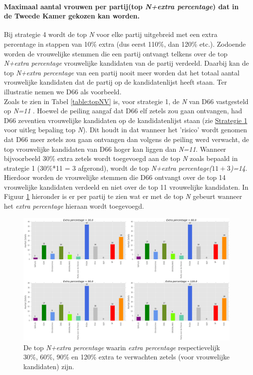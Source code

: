 \paragraph{Maximaal aantal vrouwen per partij(top \textit{N+extra percentage}) dat in de Tweede Kamer gekozen kan worden.} 
Bij strategie 4 wordt de top \textit{N} voor elke partij uitgebreid met een extra percentage in stappen van 10\% extra (dus eerst 110\%, dan 120\% etc.). Zodoende worden de vrouwelijke stemmen die een partij ontvangt telkens over de top \textit{N+extra percentage} vrouwelijke kandidaten van de partij verdeeld. Daarbij kan de top \textit{N+extra percentage} van een partij nooit meer worden dat het totaal aantal vrouwelijke kandidaten dat de partij op de kandidatenlijst heeft staan. Ter illustratie nemen we D66 als voorbeeld. 
\\
\indent Zoals te zien in Tabel \ref{table:topNV} is, voor strategie 1, de \textit{N} van D66 vastgesteld op \textit{N=11} . Hoewel de peiling aangaf dat D66 elf zetels zou gaan ontvangen, had D66 zeventien vrouwelijke kandidaten op de kandidatenlijst staan (zie \hyperref[S1V]{Strategie 1} voor uitleg bepaling top \textit{N}). Dit houdt in dat wanneer het 'risico' wordt genomen dat D66 meer zetels zou gaan ontvangen dan volgens de peiling werd verwacht, de top vrouwelijke kandidaten van D66 hoger kan liggen dan \textit{N=11}. Wanneer bijvoorbeeld 30\% extra zetels wordt toegevoegd aan de top \textit{N} zoals bepaald in strategie 1 (30\%*11 = 3 afgerond), wordt de top \textit{N+extra percentage($11+3$)=14}. Hierdoor worden de vrouwelijke stemmen die D66 ontvangt over de top 14 vrouwelijke kandidaten verdeeld en niet over de top 11 vrouwelijke kandidaten. In Figuur \ref{fig:NexpV} hieronder is er per partij te zien wat er met de top \textit{N} gebeurt wanneer het \textit{extra percentage} hieraan wordt toegevoegd.      


\begin{figure}[H]

	\includegraphics[width=\linewidth]{topn_vermenigvuldiging2.png}

			\caption{De top \textit{N+extra percentage} waarin \textit{extra percentage} respectievelijk 30\%, 60\%, 90\% en 120\% extra te verwachten zetels (voor vrouwelijke kandidaten) zijn.}

\label{fig:NexpV}
\end{figure}

